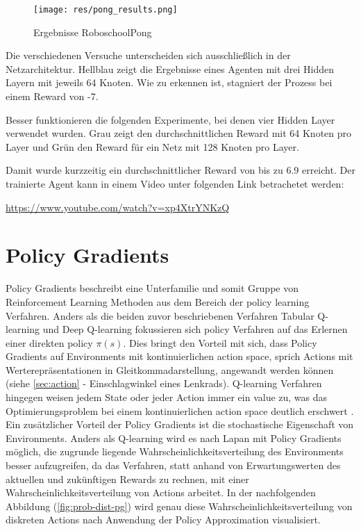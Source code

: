 \documentclass[11pt]{scrartcl}
\begin{document}
\begin{figure}[htp]
\centering
\texttt{[image: res/pong\_results.png]}
\caption{Ergebnisse RoboschoolPong}
\label{fig:pong_results}
\end{figure}
\noindent
Die verschiedenen Versuche unterscheiden sich ausschließlich in der Netzarchitektur. Hellblau zeigt
die Ergebnisse eines Agenten mit drei Hidden Layern mit jeweils 64 Knoten. Wie zu erkennen ist,
stagniert der Prozess bei einem Reward von -7.

Besser funktionieren die folgenden Experimente, bei denen vier Hidden Layer verwendet wurden.
Grau zeigt den durchschnittlichen Reward mit 64 Knoten pro Layer und Grün den Reward für
ein Netz mit 128 Knoten pro Layer.

Damit wurde kurzzeitig ein durchschnittlicher Reward von bis zu 6.9 erreicht. Der
trainierte Agent kann in einem Video unter folgenden Link betrachetet werden:

\url{https://www.youtube.com/watch?v=xp4XtrYNKzQ}

\newpage
\section{Policy Gradients}
Policy Gradients beschreibt eine Unterfamilie und somit Gruppe von Reinforcement Learning 
Methoden aus dem Bereich der policy learning Verfahren. Anders als die beiden zuvor
beschriebenen Verfahren Tabular Q-learning und Deep Q-learning fokussieren sich policy
Verfahren auf das Erlernen einer direkten policy $\pi(s)$. Dies bringt den Vorteil mit sich,
dass Policy Gradients auf Environments mit kontinuierlichen action space, sprich Actions mit
Werterepräsentationen in Gleitkommadarstellung, angewandt werden können (siehe
\ref{sec:action}  - Einschlagwinkel eines Lenkrads). Q-learning Verfahren
hingegen weisen jedem State oder jeder Action immer ein value zu, was das Optimierungsproblem
bei einem kontinuierlichen action space deutlich erschwert \cite[~S.242]{L2018}. Ein
zusätzlicher Vorteil der Policy Gradients ist die stochastische Eigenschaft von Environments.
Anders als Q-learning wird es nach Lapan\cite[~S.242]{L2018} mit Policy Gradients möglich,
die zugrunde liegende Wahrscheinlichkeitsverteilung des Environments besser aufzugreifen,
da das Verfahren, statt anhand von Erwartungswerten des aktuellen und zukünftigen Rewards zu
rechnen, mit einer Wahrscheinlichkeitsverteilung von Actions arbeitet. In der nachfolgenden
Abbildung (\ref{fig:prob-dist-pg}) wird genau diese Wahrscheinlichkeitsverteilung von
diskreten Actions nach Anwendung der Policy Approximation visualisiert.
\end{document}

